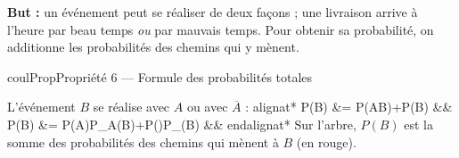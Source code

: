 \documentclass[11pt,a4paper]{article}
\makeatletter
\newlength{\retraitcalculs}
\newcounter{lycee@signet}
\newcommand{\signet}[3][]{\stepcounter{lycee@signet}%
  \edef\lycee@dest{\if\relax\detokenize{#1}\relax
    signet.\arabic{lycee@signet}\else#1\fi}%
  \hypertarget{\lycee@dest}{}\bookmark[level=#2,dest=\lycee@dest]{#3}}
\newenvironment{proprietebox}[1][Propriété]%
  {\begin{boitecours}[phantom={\signet{2}{#1}}]{coulProp}{#1}}{\end{boitecours}}
\newenvironment{calculs}{\setlength{\jot}{5pt}\@fleqntrue\@mathmargin\retraitcalculs
  \setlength{\abovedisplayskip}{4pt}\setlength{\belowdisplayskip}{4pt}%
  \setlength{\abovedisplayshortskip}{4pt}\setlength{\belowdisplayshortskip}{4pt}%
  \csname alignat*\endcsname{2}}%
  {\csname endalignat*\endcsname}
\makeatother
\begin{document}
\textbf{But :} un événement peut se réaliser de deux façons ; une livraison arrive à l'heure
par beau temps \emph{ou} par mauvais temps. Pour obtenir sa probabilité, on additionne les
probabilités des chemins qui y mènent.

\begin{proprietebox}[Propriété 6 --- Formule des probabilités totales]
\begin{minipage}[c]{0.5\linewidth}\raggedright
L'événement $B$ se réalise avec $A$ ou avec $\overline{A}$ :
\begin{calculs}
P(B) &= P(A\cap B)+P(\cap B) &&\\
P(B) &= P(A)\times P_A(B)+P()\times P_{}(B) &&
\end{calculs}
Sur l'arbre, $P(B)$ est la somme des probabilités des chemins qui mènent à $B$ (en rouge).
\end{minipage}\hfill
\begin{minipage}[c]{0.46\linewidth}\centering
{}
\end{minipage}
\end{proprietebox}
\end{document}
